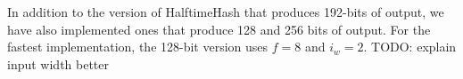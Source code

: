 \documentclass[sigconf, nonacm]{acmart}
\begin{document}





In addition to the version of HalftimeHash that produces 192-bits of output, we have also implemented ones that produce 128 and 256 bits of output.
For the fastest implementation, the 128-bit version uses $f = 8$ and $i_w = 2$.
TODO: explain input width better

\end{document}
